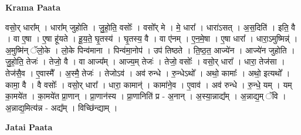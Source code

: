 \documentclass[17pt]{extarticle}
\begin{document}
\textbf{Krama Paata} \newline

वसो॒र् धारा᳚म् । धारा᳚म् जुहोति । जु॒हो॒ति॒ वसोः᳚ । वसो᳚र् मे । मे॒ धारा᳚ । धारा॑ऽसत् । अ॒स॒दिति॑ । इति॒ वै । वा ए॒षा । ए॒षा हू॑यते । हू॒य॒ते॒ घृ॒तस्य॑ । घृ॒तस्य॒ वै । वा ए॑नम् । ए॒न॒मे॒षा । ए॒षा धारा᳚ । धारा॒ऽमुष्मिन्न्॑ । अ॒मुष्मि॑न् ॅलो॒के । लो॒के पिन्व॑माना । पिन्व॑मा॒नोप॑ । उप॑ तिष्ठते । ति॒ष्ठ॒त॒ आज्ये॑न । आज्ये॑न जुहोति । जु॒हो॒ति॒ तेजः॑ । तेजो॒ वै । वा आज्य᳚म् । आज्य॒म् तेजः॑ । तेजो॒ वसोः᳚ । वसो॒र् धारा᳚ । धारा॒ तेज॑सा । तेज॑सै॒व । ए॒वास्मै᳚ । अ॒स्मै॒ तेजः॑ । तेजोऽव॑ । अव॑ रुन्धे । रु॒न्धेऽथो᳚ । अथो॒ कामाः᳚ । अथो॒ इत्यथो᳚ । कामा॒ वै । वै वसोः᳚ । वसो॒र् धारा᳚ । धारा॒ कामान्॑ । कामा॑ने॒व । ए॒वाव॑ । अव॑ रुन्धे । रु॒न्धे॒ यम् । यम् का॒मये॑त । का॒मये॑त प्रा॒णान् । प्रा॒णान॑स्य । प्रा॒णानिति॑ प्र - अ॒नान् । अ॒स्या॒न्नाद्य᳚म् । अ॒न्नाद्य॒म् ॅवि । अ॒न्नाद्य॒मित्य॑न्न - अद्य᳚म् । विच्छि॑न्द्याम् । \newline

\textbf{Jatai Paata} \newline
\end{document}
